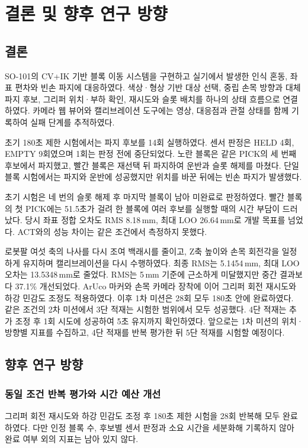 \chapter{결론 및 향후 연구 방향}
\section{결론}
SO-101의 CV+IK 기반 블록 이동 시스템을 구현하고 실기에서 발생한 인식 혼동, 좌표 편차와 빈손 파지에 대응하였다. 색상·형상 기반 대상 선택, 중립 손목 방향과 대체 파지 후보, 그리퍼 위치·부하 확인, 재시도와 슬롯 배치를 하나의 상태 흐름으로 연결하였다. 카메라 웹 뷰어와 캘리브레이션 도구에는 영상, 대응점과 관절 상태를 함께 기록하여 실패 단계를 추적하였다.

초기 180초 제한 시험에서는 파지 후보를 14회 실행하였다. 센서 판정은 HELD 4회, EMPTY 9회였으며 1회는 판정 전에 중단되었다. 노란 블록은 같은 PICK의 세 번째 후보에서 파지했고, 빨간 블록은 재선택 뒤 파지하여 운반과 슬롯 해제를 마쳤다. 단일 블록 시험에서는 파지와 운반에 성공했지만 위치를 바꾼 뒤에는 빈손 파지가 발생했다.

초기 시험은 네 번의 슬롯 해제 후 마지막 블록이 남아 미완료로 판정하였다. 빨간 블록의 첫 PICK에는 51.5초가 걸려 한 블록에 여러 후보를 실행할 때의 시간 부담이 드러났다. 당시 좌표 정합 오차도 RMS 8.18\,mm, 최대 LOO 26.64\,mm로 개발 목표를 넘었다. ACT와의 성능 차이는 같은 조건에서 측정하지 못했다.

로봇팔 여섯 축의 나사를 다시 조여 백래시를 줄이고, Z축 높이와 손목 회전각을 일정하게 유지하며 캘리브레이션을 다시 수행하였다. 최종 RMS는 5.1454\,mm, 최대 LOO 오차는 13.5348\,mm로 줄었다. RMS는 5\,mm 기준에 근소하게 미달했지만 중간 결과보다 37.1\% 개선되었다. ArUco 마커와 손목 카메라 장착에 이어 그리퍼 회전 재시도와 하강 민감도 조정도 적용하였다. 이후 1차 미션은 28회 모두 180초 안에 완료하였다. 같은 조건의 2차 미션에서 3단 적재는 시험한 범위에서 모두 성공했다. 4단 적재는 추가 조정 후 1회 시도에 성공하여 5초 유지까지 확인하였다. 앞으로는 1차 미션의 위치·방향별 지표를 수집하고, 4단 적재를 반복 평가한 뒤 5단 적재를 시험할 예정이다.

\section{향후 연구 방향}
\subsection{동일 조건 반복 평가와 시간 예산 개선}
그리퍼 회전 재시도와 하강 민감도 조정 후 180초 제한 시험을 28회 반복해 모두 완료하였다. 다만 인정 블록 수, 후보별 센서 판정과 소요 시간을 세분화해 기록하지 않아 완료 여부 외의 지표는 남아 있지 않다.

